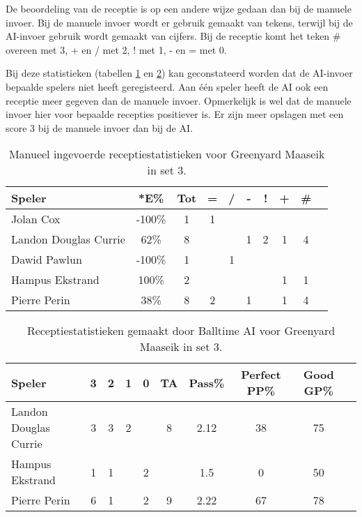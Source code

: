 De beoordeling van de receptie is op een andere wijze gedaan dan bij de manuele invoer. Bij de manuele invoer wordt er gebruik gemaakt van tekens, terwijl bij de AI-invoer gebruik wordt gemaakt van cijfers. Bij de receptie komt het teken \# overeen met 3, + en / met 2, ! met 1, - en = met 0.

Bij deze statistieken (tabellen \ref{tab:PL3ReceiveMaaseikMan3} en \ref{tab:PL3ReceiveMaaseikAI3}) kan geconstateerd worden dat de AI-invoer bepaalde spelers niet heeft geregisteerd. Aan één speler heeft de AI ook een receptie meer gegeven dan de manuele invoer. Opmerkelijk is wel dat de manuele invoer hier voor bepaalde recepties positiever is. Er zijn meer opslagen met een score 3 bij de manuele invoer dan bij de AI.

\begin{table}[ht!]
    \centering
    \scriptsize
    \begin{tabular}{|l|c|c|c|c|c|c|c|c|c|} \hline
        \textbf{Speler} & *E\% & Tot & = & / & - & ! & + & \#\\ \hline
        Jolan Cox & -100\% & 1 & 1 &  &  &  &  & \\ 
        Landon Douglas Currie & 62\% & 8 &  &  & 1 & 2 & 1 & 4 \\ 
        Dawid Pawlun & -100\% & 1 &  & 1 &  &  &  &  \\ 
        Hampus Ekstrand & 100\% & 2 &  &  &  &  & 1 & 1 \\ 
        Pierre Perin & 38\% & 8 & 2 &  & 1 &  & 1 & 4 \\ \hline
    \end{tabular}
    \caption[Manueel ingevoerde receptiestatistieken voor Greenyard Maaseik in set 3]{\label{tab:PL3ReceiveMaaseikMan3}Manueel ingevoerde receptiestatistieken voor Greenyard Maaseik in set 3.}
\end{table}

\begin{table}[ht!]
  \centering
  \scriptsize
  \begin{tabular}{|l|c|c|c|c|c|c|c|c|c|} \hline
    \textbf{Speler} & 3 & 2 & 1 & 0 & TA & Pass\% & Perfect PP\% & Good GP\% \\ \hline
    Landon Douglas Currie & 3 & 3 & 2 &  & 8 & 2.12 & 38 & 75 \\
    Hampus Ekstrand & 1 & 1 &   & 2 & & 1.5 & 0 & 50 \\
    Pierre Perin & 6 & 1 &   & 2 & 9 & 2.22 & 67 & 78 \\ \hline
  \end{tabular}
  \caption[Receptiestatistieken gemaakt door Balltime AI voor Greenyard Maaseik in set 3]{\label{tab:PL3ReceiveMaaseikAI3}Receptiestatistieken gemaakt door Balltime AI voor Greenyard Maaseik in set 3.}
\end{table}

